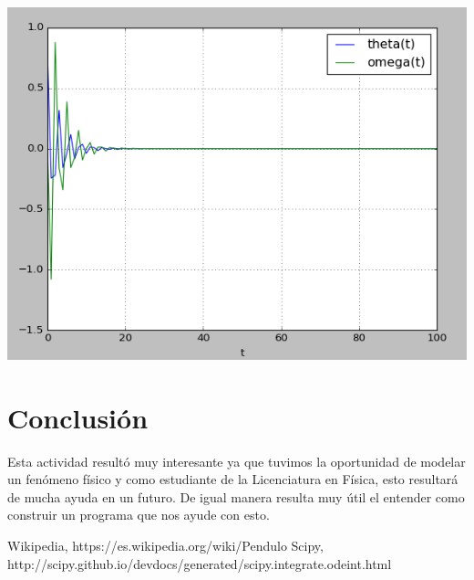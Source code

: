 \documentclass[12pt,letterpaper]{article}
\begin{document}
\begin{center}
\includegraphics[scale=0.6]{act5caso4.png}
\end{center}

\section*{Conclusión}
Esta actividad resultó muy interesante ya que tuvimos la oportunidad de modelar un fenómeno físico y como estudiante de la Licenciatura en Física, esto resultará de mucha ayuda en un futuro. De igual manera resulta muy útil el entender como construir un programa que nos ayude con esto. 

\begin{thebibliography}{widestlabel}
	 Wikipedia, https://es.wikipedia.org/wiki/Pendulo
	 Scipy, http://scipy.github.io/devdocs/generated/scipy.integrate.odeint.html
\end{thebibliography}
\end{document}
